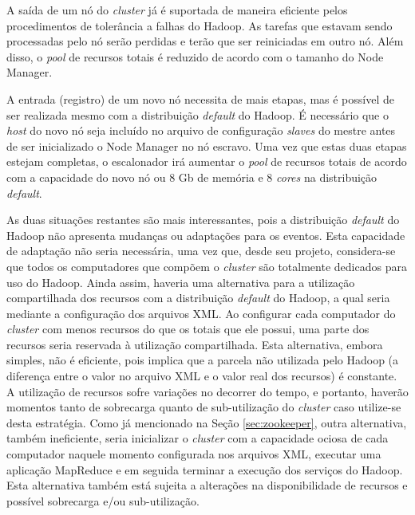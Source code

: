 A saída de um nó do \textit{cluster} já é suportada de maneira eficiente pelos procedimentos de tolerância a falhas do Hadoop. As tarefas que estavam sendo processadas pelo nó serão perdidas e terão que ser reiniciadas em outro nó. Além disso, o \textit{pool} de recursos totais é reduzido de acordo com o tamanho do Node Manager.

A entrada (registro) de um novo nó necessita de mais etapas, mas é possível de ser realizada mesmo com a distribuição \textit{default} do Hadoop. É necessário que o \textit{host} do novo nó seja incluído no arquivo de configuração \textit{slaves} do mestre antes de ser inicializado o Node Manager no nó escravo. Uma vez que estas duas etapas estejam completas, o escalonador irá aumentar o \textit{pool} de recursos totais de acordo com a capacidade do novo nó ou 8 Gb de memória e 8 \textit{cores} na distribuição \textit{default}.

As duas situações restantes são mais interessantes, pois a distribuição \textit{default} do Hadoop não apresenta mudanças ou adaptações para os eventos. Esta capacidade de adaptação não seria necessária, uma vez que, desde seu projeto, considera-se que todos os computadores que compõem o \textit{cluster} são totalmente dedicados para uso do Hadoop. Ainda assim, haveria uma alternativa para a utilização compartilhada dos recursos com a distribuição \textit{default} do Hadoop, a qual seria mediante a configuração dos arquivos XML. Ao configurar cada computador do \textit{cluster} com menos recursos do que os totais que ele possui, uma parte dos recursos seria reservada à utilização compartilhada. Esta alternativa, embora simples, não é eficiente, pois implica que a parcela não utilizada pelo Hadoop (a diferença entre o valor no arquivo XML e o valor real dos recursos) é constante. A utilização de recursos sofre variações no decorrer do tempo, e portanto, haverão momentos tanto de sobrecarga quanto de sub-utilização do \textit{cluster} caso utilize-se desta estratégia. Como já mencionado na Seção \ref{sec:zookeeper}, outra alternativa, também ineficiente, seria inicializar o \textit{cluster} com a capacidade ociosa de cada computador naquele momento configurada nos arquivos XML, executar uma aplicação MapReduce e em seguida terminar a execução dos serviços do Hadoop. Esta alternativa também está sujeita a alterações na disponibilidade de recursos e possível sobrecarga e/ou sub-utilização.

